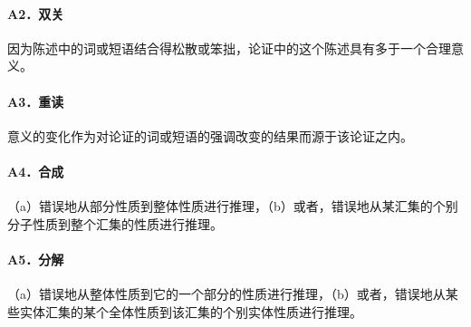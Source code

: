 \paragraph{A2．双关}
因为陈述中的词或短语结合得松散或笨拙，论证中的这个陈述具有多于一个合理意义。

\paragraph{A3．重读}
意义的变化作为对论证的词或短语的强调改变的结果而源于该论证之内。

\paragraph{A4．合成}
（a）错误地从部分性质到整体性质进行推理，（b）或者，错误地从某汇集的个别分子性质到整个汇集的性质进行推理。

\paragraph{A5．分解}
（a）错误地从整体性质到它的一个部分的性质进行推理，（b）或者，错误地从某些实体汇集的某个全体性质到该汇集的个别实体性质进行推理。

\begin{center}
\end{center} 